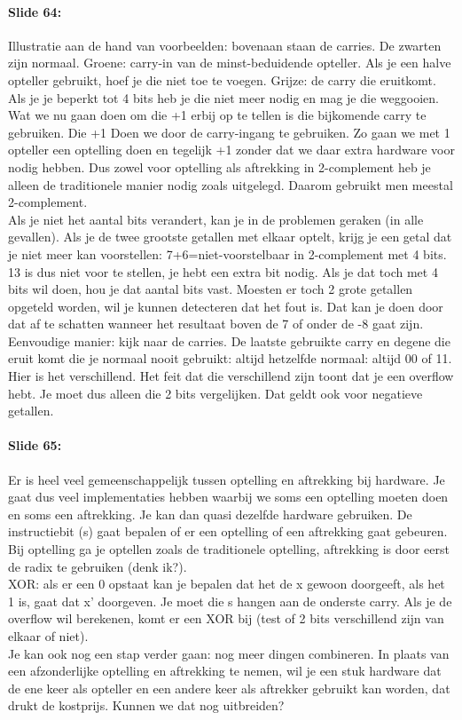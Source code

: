 \documentclass[10pt,a4paper]{book}
\begin{document}
\paragraph{Slide 64:} Illustratie aan de hand van voorbeelden: bovenaan staan de carries. De zwarten zijn normaal. Groene: carry-in van de minst-beduidende opteller. Als je een halve opteller gebruikt, hoef je die niet toe te voegen. Grijze: de carry die eruitkomt. Als je je beperkt tot 4 bits heb je die niet meer nodig en mag je die weggooien. Wat we nu gaan doen om die +1 erbij op te tellen is die bijkomende carry te gebruiken. Die +1 Doen we door de carry-ingang te gebruiken. Zo gaan we met 1 opteller een optelling doen en tegelijk +1 zonder dat we daar extra hardware voor nodig hebben. Dus zowel voor optelling als aftrekking in 2-complement heb je alleen de traditionele manier nodig zoals uitgelegd. Daarom gebruikt men meestal 2-complement.\\
Als je niet het aantal bits verandert, kan je in de problemen geraken (in alle gevallen). Als je de twee grootste getallen met elkaar optelt, krijg je een getal dat je niet meer kan voorstellen: 7+6=niet-voorstelbaar in 2-complement met 4 bits. 13 is dus niet voor te stellen, je hebt een extra bit nodig. Als je dat toch met 4 bits wil doen, hou je dat aantal bits vast. Moesten er toch 2 grote getallen opgeteld worden, wil je kunnen detecteren dat het fout is. Dat kan je doen door dat af te schatten wanneer het resultaat boven de 7 of onder de -8 gaat zijn. Eenvoudige manier: kijk naar de carries. De laatste gebruikte carry en degene die eruit komt die je normaal nooit gebruikt: altijd hetzelfde normaal: altijd 00 of 11. Hier is het verschillend. Het feit dat die verschillend zijn toont dat je een overflow hebt. Je moet dus alleen die 2 bits vergelijken. Dat geldt ook voor negatieve getallen.

\paragraph{Slide 65:} Er is heel veel gemeenschappelijk tussen optelling en aftrekking bij hardware. Je gaat dus veel implementaties hebben waarbij we soms een optelling moeten doen en soms een aftrekking. Je kan dan quasi dezelfde hardware gebruiken. De instructiebit (s) gaat bepalen of er een optelling of een aftrekking gaat gebeuren. Bij optelling ga je optellen zoals de traditionele optelling, aftrekking is door eerst de radix te gebruiken (denk ik?).\\
XOR: als er een 0 opstaat kan je bepalen dat het de x gewoon doorgeeft, als het 1 is, gaat dat x' doorgeven. Je moet die s hangen aan de onderste carry. Als je de overflow wil berekenen, komt er een XOR bij (test of 2 bits verschillend zijn van elkaar of niet).\\
Je kan ook nog een stap verder gaan: nog meer dingen combineren. In plaats van een afzonderlijke optelling en aftrekking te nemen, wil je een stuk hardware dat de ene keer als opteller en een andere keer als aftrekker gebruikt kan worden, dat drukt de kostprijs. Kunnen we dat nog uitbreiden? 
\end{document}
